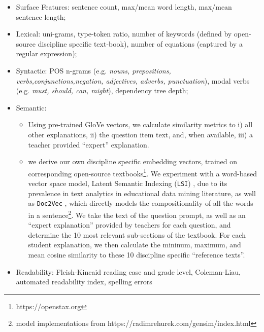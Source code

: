 \documentclass[notitlepage,12pt]{jedm}
\begin{document}
\begin{itemize}
	
	\item Surface Features: 
	sentence count, 
	max/mean word length, 
	max/mean sentence length;
	
	\item Lexical: 
	uni-grams, 
	type-token ratio, 
	number of keywords (defined by open-source discipline specific 
	text-book), 
	number of equations (captured by a regular expression);
	
	\item Syntactic: 
	POS n-grams (e.g. \textit{nouns, prepositions, 
		verbs,conjunctions,negation, adjectives, adverbs, punctuation}), 
	modal verbs (e.g. \textit{must, should, can, might}),
	dependency tree depth;
	
	\item Semantic:
	\begin{itemize}
		\item Using pre-trained GloVe \cite{pennington_glove:_2014} vectors, we 
		calculate similarity metrics to i) all other explanations, ii) the 
		question item text, and, when available, iii) a teacher provided 
		``expert'' explanation.
		\item we derive our own discipline specific embedding vectors, trained 
		on corresponding open-source textbooks\footnote{https://openstax.org}. 
		We experiment with a word-based vector space model, Latent Semantic 
		Indexing (\verb|LSI|) \cite{deerwester_indexing_1990}, due to its 
		prevalence in text analytics in educational data mining literature, as 
		well as \verb|Doc2Vec| \cite{le_distributed_2014}, which directly 
		models the compositionality of all the words in a 
		sentence\footnote{model implementations from 
		https://radimrehurek.com/gensim/index.html}.
		We take the text of the question prompt, as well as an ``expert 
		explanation'' provided by teachers for each question, and determine the 
		10 most relevant sub-sections of the textbook.
		For each student explanation, we then calculate the mininum, maximum, 
		and mean cosine similarity to these 10 discipline specific ``reference 
		texts''.
		 
	\end{itemize}
		
	
	\item Readability:
	Fleish-Kincaid reading ease and grade level,
	Coleman-Liau,
	automated readability index, 
	spelling errors
	
\end{itemize}
\end{document}
